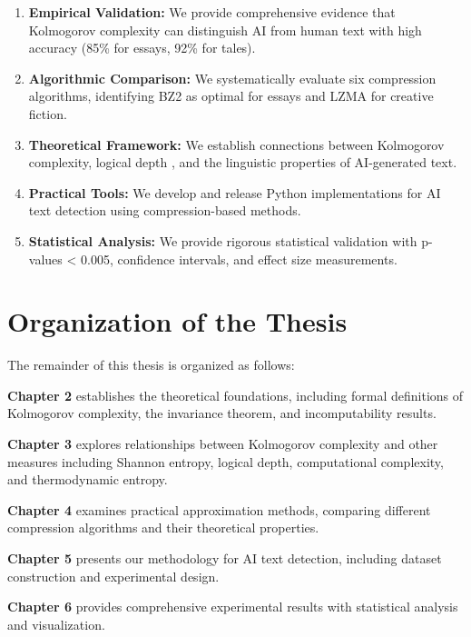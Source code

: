 \documentclass[12pt,a4paper]{report}
\begin{document}
\begin{enumerate}
    \item \textbf{Empirical Validation:} We provide comprehensive evidence that Kolmogorov complexity can distinguish AI from human text with high accuracy (85\% for essays, 92\% for tales).

    \item \textbf{Algorithmic Comparison:} We systematically evaluate six compression algorithms, identifying BZ2 as optimal for essays and LZMA for creative fiction.

    \item \textbf{Theoretical Framework:} We establish connections between Kolmogorov complexity, logical depth \cite{bennett1988logical}, and the linguistic properties of AI-generated text.

    \item \textbf{Practical Tools:} We develop and release Python implementations for AI text detection using compression-based methods.

    \item \textbf{Statistical Analysis:} We provide rigorous statistical validation with p-values < 0.005, confidence intervals, and effect size measurements.
\end{enumerate}

\section{Organization of the Thesis}

The remainder of this thesis is organized as follows:

\textbf{Chapter 2} establishes the theoretical foundations, including formal definitions of Kolmogorov complexity, the invariance theorem, and incomputability results.

\textbf{Chapter 3} explores relationships between Kolmogorov complexity and other measures including Shannon entropy, logical depth, computational complexity, and thermodynamic entropy.

\textbf{Chapter 4} examines practical approximation methods, comparing different compression algorithms and their theoretical properties.

\textbf{Chapter 5} presents our methodology for AI text detection, including dataset construction and experimental design.

\textbf{Chapter 6} provides comprehensive experimental results with statistical analysis and visualization.
\end{document}
